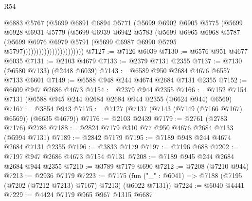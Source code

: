 \begin{lexlean}{R54}
\begin{coremodule}
                                    @6883
                                    @5767
                                    (@5699
                                      @6891
                                      @6894
                                      @5771
                                      (@5699
                                        @6902
                                        @6905
                                        @5775
                                        (@5699
                                          @6928
                                          @6931
                                          @5779
                                          (@5699
                                            @6939
                                            @6942
                                            @5783
                                            (@5699
                                              @6965
                                              @6968
                                              @5787
                                              (@5699
                                                @6976
                                                @6979
                                                @5791
                                                (@5699
                                                  @6987
                                                  @6990
                                                  @5795
                                                  @5797)))))))))))))))))))))))
@7127 := @7126 @6039
@7130 := @6576 @951 @4677 @6035
@7131 := @2103 @4679
@7133 := @2379 @7131 @2355
@7137 := @7130 (@6580 @7133) (@2448 @6039)
@7143 := @6589 @950 @2684 @4676 @6557 @7133 @6601
@7149 := @6588 @948 @244 @4674 @2684 @7131 @2355
@7152 := @6609 @947 @2686 @4673
@7154 := @2379 @944 @2355
@7166 := @7152 @7154 @7131 (@6588 @945 @244 @2684 @2684 @944 @2355 (@6624 @944) @6569)
@7167 := @3854 @943
@7175 := @7127 (@7137 (@7143 (@7149 (@7166 @7167) @6569)) (@6635 @4679))
@7176 := @2103 @2439
@7179 := @2761 (@2783 @7176) @2786
@7188 := @2824 @7179 @310 @77 @950 @4676 @2684 @7133 (@5994 @7131)
@7189 := @2842 @7179
@7195 := @7189 @948 @244 @4674 @2684 @7131 @2355
@7196 := @3833 @7179
@7197 := @7196 @688
@7202 := @7197 @947 @2686 @4673 @7154 @7131
@7208 := @7189 @945 @244 @2684 @2684 @944 @2355
@7210 := @3789 @7179 @690
@7212 := @7208 (@7210 @944)
@7213 := @2936 @7179
@7223 := @7175 (fun ("_" : @6041) => @7188 (@7195 (@7202 (@7212 @7213) @7167) @7213) (@6022 @7131))
@7224 := @6040 @4441
@7229 := @4424 @7179 @965 @967 @1315 @6687

\end{coremodule}
\end{lexlean}
